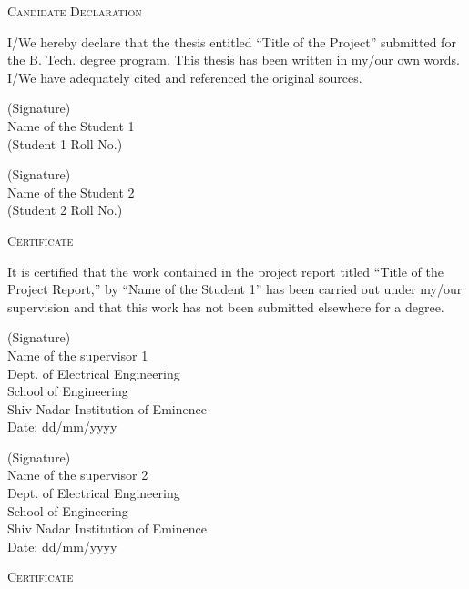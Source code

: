 \documentclass[a4paper,12pt]{report}
\begin{document}
\pagebreak
\begin{center}
\huge{\textsc{Candidate Declaration}}
\vspace{1cm}
\end{center}
I/We hereby declare that the thesis entitled “Title of the Project” submitted for the B. Tech. degree program. This thesis has been written in my/our own words. I/We have adequately cited and referenced the original sources.
\vspace{2cm}\\
\begin{minipage}{4.5cm}
(Signature)\\
Name of the Student 1\\
(Student 1 Roll No.)
\end{minipage}
\hfill
\begin{minipage}{4.5cm}
(Signature)\\
Name of the Student 2\\
(Student 2 Roll No.)
\end{minipage}
\pagebreak
\begin{center}
\huge{\textsc{Certificate}}
\vspace{1cm}
\end{center}
It is certified that the work contained in the project report titled “Title of the Project Report,” by “Name of the Student 1” has been carried out under my/our supervision and that this work has not been submitted elsewhere for a degree.
\vspace{2cm}\\
\begin{minipage}{7cm}
(Signature)\\
Name of the supervisor 1\\
Dept. of Electrical Engineering\\
School of Engineering\\
Shiv Nadar Institution of Eminence\\
Date: dd/mm/yyyy 
\end{minipage}
\hfill
\begin{minipage}{7cm}
(Signature)\\
Name of the supervisor 2\\
Dept. of Electrical Engineering\\
School of Engineering\\
Shiv Nadar Institution of Eminence\\
Date: dd/mm/yyyy 
\end{minipage}
\pagebreak
\begin{center}
\huge{\textsc{Certificate}}
\vspace{1cm}
\end{center}
\end{document}
